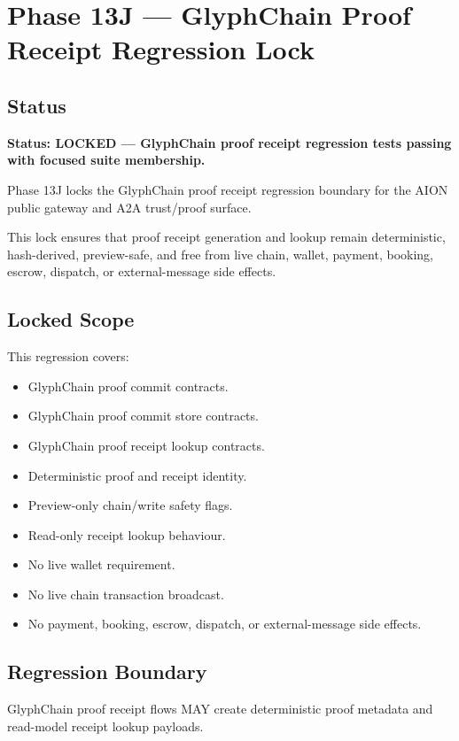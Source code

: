 \section{Phase 13J --- GlyphChain Proof Receipt Regression Lock}
\label{sec:phase13j-glyphchain-proof-receipt-regression-lock}

\subsection{Status}

\textbf{Status: LOCKED --- GlyphChain proof receipt regression tests passing with focused suite membership.}

Phase 13J locks the GlyphChain proof receipt regression boundary for the AION public gateway and A2A trust/proof surface.

This lock ensures that proof receipt generation and lookup remain deterministic, hash-derived, preview-safe, and free from live chain, wallet, payment, booking, escrow, dispatch, or external-message side effects.

\subsection{Locked Scope}

This regression covers:

\begin{itemize}
  \item GlyphChain proof commit contracts.
  \item GlyphChain proof commit store contracts.
  \item GlyphChain proof receipt lookup contracts.
  \item Deterministic proof and receipt identity.
  \item Preview-only chain/write safety flags.
  \item Read-only receipt lookup behaviour.
  \item No live wallet requirement.
  \item No live chain transaction broadcast.
  \item No payment, booking, escrow, dispatch, or external-message side effects.
\end{itemize}

\subsection{Regression Boundary}

GlyphChain proof receipt flows MAY create deterministic proof metadata and read-model receipt lookup payloads.

